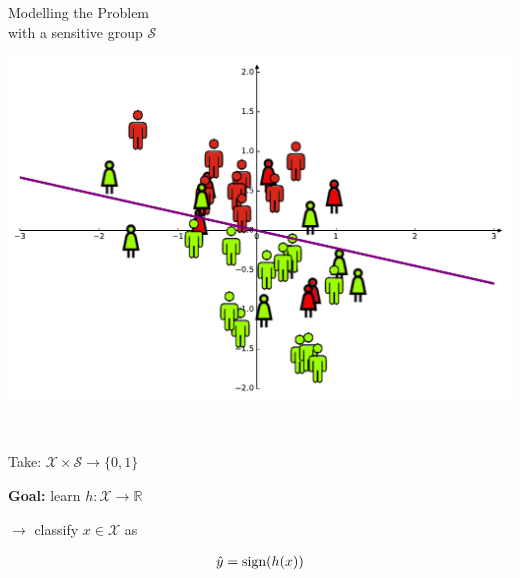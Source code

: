 \documentclass[aspectratio=169,14pt]{beamer}
\begin{document}
\begin{frame}{Modelling the Problem\\[-0.5em]
  \large with a sensitive group $\mathcal{S}$}
  \begin{minipage}{0.5\linewidth}
    \includegraphics[width=\textwidth]{images/dataset-fairness.png}
  \end{minipage}%
  ~~~~~~
  \begin{minipage}{0.4\linewidth}
    Take: $\mathcal{X} \times \mathcal{S} \rightarrow \{0, 1\}$

    \vspace{1em}

    \textbf{Goal:} learn $h : \mathcal{X} \rightarrow \mathbb{R}$

    \vspace{0.5em}

    $\rightarrow$ classify $x \in \mathcal{X}$ as
    
    \vspace{-1.5em}

    \begin{align*}
      \hat{y} = \text{sign}\!\left(h(x)\right)
    \end{align*}
  \end{minipage}%
\end{frame}
\end{document}
